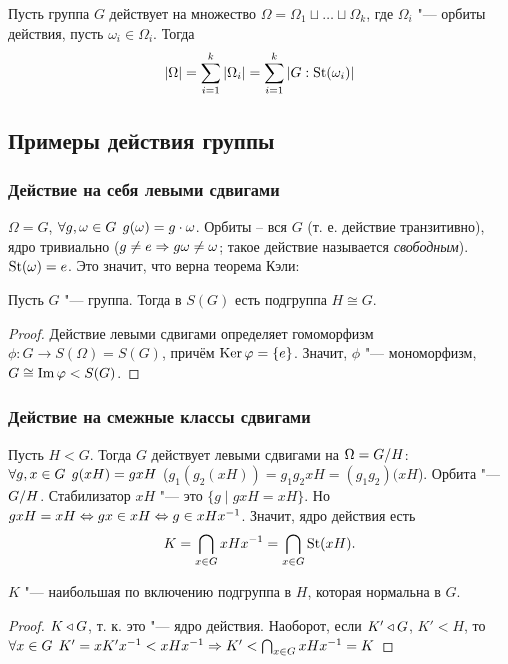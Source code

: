 \documentclass[main]{subfiles}
\begin{document}
\begin{theorem}
  Пусть группа $G$ действует
  на множество $\Omega = \Omega_1 \sqcup \dots \sqcup \Omega_k$,
  где $\Omega_i$ "--- орбиты действия,
  пусть $\omega_i \in \Omega_i$.
  Тогда
  $$|\Omega| = \sum_{i = 1}^k |\Omega_i| = \sum_{i = 1}^k |G : \operatorname{St}(\omega_i)|$$
\end{theorem}

\subsection{Примеры действия группы}
\subsubsection{Действие на себя левыми сдвигами}
$\Omega = G$, $\forall {g, \omega \in G} \; \,
g(\omega) = g \cdot \omega$.
Орбиты -- вся $G$ (т. е. действие транзитивно),
ядро тривиально
($g \ne e \Rightarrow g \omega \ne \omega$;
такое действие называется \emph{свободным}).
$\operatorname{St}(\omega) = e$.
Это значит, что верна теорема Кэли:
\begin{theorem}[Кэли]
  Пусть $G$ "--- группа.
  Тогда в $S(G)$ есть подгруппа $H \cong G$.
\end{theorem}
\begin{proof}
  Действие левыми сдвигами определяет гомоморфизм $\phi : G \to S(\Omega) = S(G)$,
  причём $\operatorname{Ker} \varphi = \{e\}$. Значит, $\phi$ "--- мономорфизм,
  $G \cong \operatorname{Im} \varphi < S(G)$.
\end{proof}

\subsubsection{Действие на смежные классы сдвигами}
Пусть $H < G$.
Тогда $G$ действует левыми сдвигами на $\Omega = \Factor{G}[H]$:
$\forall {g, x \in G} \; \, g(xH) = gxH$
($g_1(g_2(xH)) = g_1g_2xH = (g_1g_2)(xH$).
Орбита "--- $\Factor{G}[H]$.
Стабилизатор $xH$ "--- это $\{g \mid gxH = xH\}$.
Но $gxH = xH \Leftrightarrow gx \in xH \Leftrightarrow g \in xHx^{-1}$.
Значит, ядро действия есть
$$K = \bigcap_{x \in G} x H x^{-1} = \bigcap_{x \in G} \operatorname{St}(xH).$$
\begin{proposition}
  $K$ "--- наибольшая по включению подгруппа в $H$, которая нормальна в $G$.
\end{proposition}
\begin{proof}
  $K \triangleleft G$, т. к. это "--- ядро действия.
  Наоборот, если $K' \triangleleft G$, $K' < H$,
  то $\forall {x \in G} \; \, K' = xK'x^{-1} < xHx^{-1} \Rightarrow
  K' < \bigcap_{x \in G} xHx^{-1} = K$
\end{proof}
\end{document}
